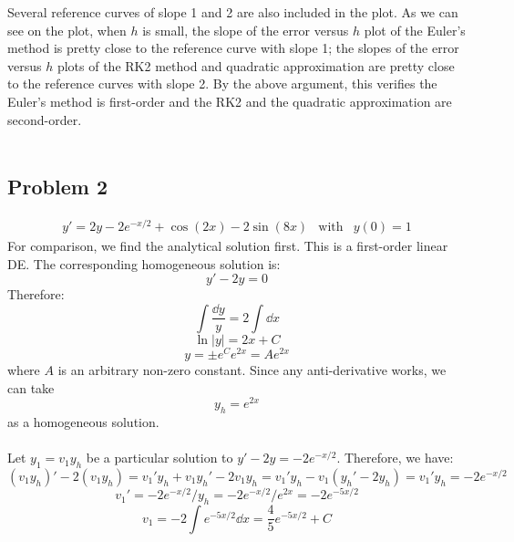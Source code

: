 \documentclass{article}
\begin{document}
Several reference curves of slope 1 and 2 are also included in the plot. As we can see on the plot, when \(h\) is small, the
slope of the error versus \(h\) plot of the Euler's method is pretty close to the reference curve with slope 1;
the slopes of the error versus \(h\) plots of the RK2 method and quadratic approximation are pretty close to the reference curves
with slope 2. By the above argument, this verifies the Euler's method is first-order and the RK2 and the quadratic approximation are second-order.
\pagebreak \\ \\
\subsection{Problem 2}
\begin{eqnarray}
  y' = 2y - 2e^{-x/2} +\cos(2x) -2\sin(8x) & \text{with} & y(0)=1
\end{eqnarray}
For comparison, we find the analytical solution first. This is a first-order linear DE. The corresponding homogeneous solution is:
\begin{equation}
  y' -2y = 0
\end{equation}
Therefore:
\begin{equation}
  \int \frac{\dd y}{y} = 2\int\dd x
\end{equation}
\begin{equation}
  \ln |y| = 2x +C
\end{equation}
\begin{equation}
  y = \pm e^C e^{2x} = A e^{2x}
\end{equation}
where \(A\) is an arbitrary non-zero constant. Since any anti-derivative works, we can take
\begin{equation}
  y_h = e^{2x}
\end{equation}
as a homogeneous solution. \\
\\
Let \(y_1 = v_1 y_h\) be a particular solution to \(y'-2y = -2e^{-x/2}\). Therefore, we have:
\begin{equation}
  (v_1y_h)' -2(v_1 y_h) = v_1'y_h + v_1y_h' -2v_1y_h = v_1'y_h - v_1(y_h' - 2y_h) = v_1'y_h = -2e^{-x/2}
\end{equation}
\begin{equation}
  v_1' = -2e^{-x/2}/ y_h= -2e^{-x/2}/ e^{2x} = -2e^{-5x/2}
\end{equation}
\begin{equation}
  v_1 = -2\int e^{-5x/2} \dd x = \frac{4}{5} e^{-5x/2} + C
\end{equation}
\end{document}

